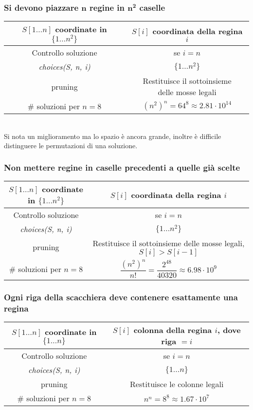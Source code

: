 \subsubsection{Si devono piazzare $\mathbf{n}$ regine in $\mathbf{n^2}$ caselle}
\begin{tabular}{|c|c|}
	\hline
	$S[1\dots n]$ coordinate in $\{1\dots n^2\}$ & $S[i]$ coordinata della regina $i$\\
	\hline
	Controllo soluzione & se $i = n$ \\
	\hline
	\emph{choices(S, n, i)} & $\{1\dots n^2\}$\\
	\hline
	pruning & \makecell{Restituisce il sottoinsieme\\ delle mosse legali}\\
	\hline
	$\#$ soluzioni per $n=8$ & $(n^2)^n = 64^{8}\approx 2.81\cdot 10^{14}$\\
	\hline
\end{tabular}\\
Si nota un miglioramento ma lo spazio \`e ancora grande, inoltre \`e difficile distinguere le permutazioni di una soluzione.
\subsubsection{Non mettere regine in caselle precedenti a quelle gi\`a scelte}
\begin{tabular}{|c|c|}
	\hline
	$S[1\dots n]$ coordinate in $\{1\dots n^2\}$ & $S[i]$ coordinata della regina $i$\\
	\hline
	Controllo soluzione & se $i = n$ \\
	\hline
	\emph{choices(S, n, i)} & $\{1\dots n^2\}$\\
	\hline
	pruning & \makecell{Restituisce il sottoinsieme\\ delle mosse legali, $S[i]>S[i-1]$}\\
	\hline
	$\#$ soluzioni per $n=8$ & $\dfrac{(n^2)^n}{n!} = \dfrac{2^{48}}{40320}\approx 6.98\cdot 10^{9}$\\
	\hline
\end{tabular}
\subsubsection{Ogni riga della scacchiera deve contenere esattamente una regina}
\begin{tabular}{|c|c|}
	\hline
	$S[1\dots n]$ coordinate in $\{1\dots n\}$ & $S[i]$ colonna della regina $i$, dove riga $= i$\\
	\hline
	Controllo soluzione & se $i = n$ \\
	\hline
	\emph{choices(S, n, i)} & $\{1\dots n\}$\\
	\hline
	pruning & Restituisce le colonne legali\\
	\hline
	$\#$ soluzioni per $n=8$ & $n^n = 8^8\approx 1.67\cdot 10^{7}$\\
	\hline
\end{tabular}
